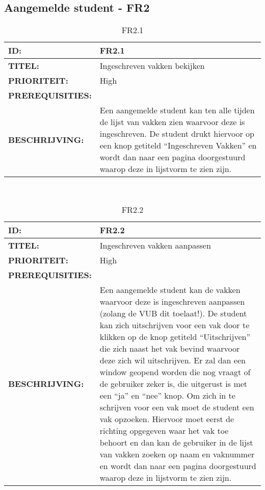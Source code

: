 \subsection{Aangemelde student - FR2}

\noindent\begin{table}[h]
            \begin{tabular}{l | p{10cm}}
                \textbf{ID:} & FR2.1 \\ \hline
                \textbf{TITEL:} & Ingeschreven vakken bekijken\\ \hline
                \textbf{PRIORITEIT:} &  High \\ \hline
                \textbf{PREREQUISITIES:} & \\ \hline
                \textbf{BESCHRIJVING:} & Een aangemelde student kan ten alle tijden de lijst van vakken zien waarvoor deze is ingeschreven. 
                                        De student drukt hiervoor op een knop getiteld “Ingeschreven Vakken” en wordt dan naar een pagina doorgestuurd waarop deze in lijstvorm te zien zijn.\\
            \end{tabular}\\
            \caption{FR2.1}
            \label{tab:myseventhtable}
        \end{table}


\noindent\begin{table}[h]
            \begin{tabular}{l | p{10cm}}
                \textbf{ID:} & FR2.2 \\ \hline
                \textbf{TITEL:} & Ingeschreven vakken aanpassen\\ \hline
                \textbf{PRIORITEIT:} &  High \\ \hline
                \textbf{PREREQUISITIES:} & \\ \hline
                \textbf{BESCHRIJVING:} & Een aangemelde student kan de vakken waarvoor deze is ingeschreven aanpassen (zolang de VUB dit toelaat!). 
                                        De student kan zich uitschrijven voor een vak door te klikken op de knop getiteld “Uitschrijven” die zich naast het vak bevind waarvoor deze zich wil uitschrijven. 
                                        Er zal dan een window geopend worden die nog vraagt of de gebruiker zeker is, die uitgerust is met een “ja” en “nee” knop. 
                                        Om zich in te schrijven voor een vak moet de student een vak opzoeken. 
                                        Hiervoor moet eerst de richting opgegeven waar het vak toe behoort en dan kan de gebruiker in de lijst van vakken zoeken op naam en vaknummer en wordt dan naar een pagina doorgestuurd waarop deze in lijstvorm te zien zijn.\\
            \end{tabular}\\
            \caption{FR2.2}
            \label{tab:myeighthtable}
        \end{table}

